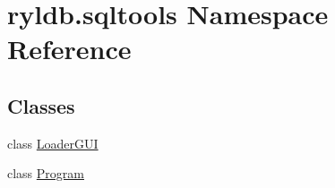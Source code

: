 \hypertarget{namespaceryldb_1_1sqltools}{}\section{ryldb.\+sqltools Namespace Reference}
\label{namespaceryldb_1_1sqltools}
\subsection*{Classes}
\begin{DoxyCompactItemize}
\item 
class \hyperlink{classryldb_1_1sqltools_1_1_loader_g_u_i}{Loader\+G\+UI}
\item 
class \hyperlink{classryldb_1_1sqltools_1_1_program}{Program}
\end{DoxyCompactItemize}
